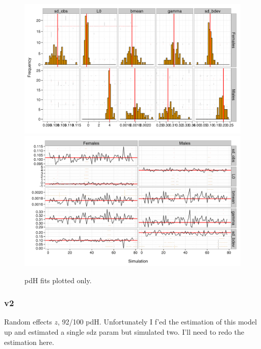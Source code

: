 \documentclass[11pt, a4paper]{article}
\begin{document}
\begin{figure}[!htbp]
  \centering
  \includegraphics[width=\linewidth]{../simulation/v1/results/SimPars.png}
  \includegraphics[width=\linewidth]{../simulation/v1/results/TracePars.png}
  \begin{quote}
    \caption{pdH fits plotted only.}
    \label{fig:sims1}
  \end{quote}
\end{figure}

\newpage\clearpage
\subsubsection{v2}
Random effects $z$, 92/100 pdH. Unfortunately I f'ed the estimation of this
model up and estimated a single sdz param but simulated two. I'll need to redo
the estimation here.
\end{document}
